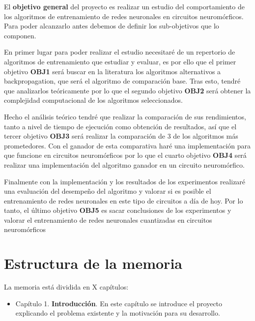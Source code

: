 El \textbf{objetivo general} del proyecto es realizar un estudio del comportamiento de los algoritmos de entrenamiento de redes neuronales en circuitos neuromórficos. Para poder alcanzarlo antes debemos de definir los sub-objetivos que lo componen.  

En primer lugar para poder realizar el estudio necesitaré de un repertorio de algoritmos de entrenamiento que estudiar y evaluar, es por ello que el primer objetivo \textbf{OBJ1} será buscar en la literatura los algoritmos alternativos a backpropagation, que será el algoritmo de comparación base. Tras esto, tendré que analizarlos teóricamente por lo que el segundo objetivo \textbf{OBJ2} será obtener la complejidad computacional de los algoritmos seleccionados. 

Hecho el análisis teórico tendré que realizar la comparación de sus rendimientos, tanto a nivel de tiempo de ejecución como obtención de resultados, así que el tercer objetivo \textbf{OBJ3} será realizar la comparación de 3 de los algoritmos más prometedores. Con el ganador de esta comparativa haré una implementación para que funcione en circuitos neuromórficos por lo que el cuarto objetivo \textbf{OBJ4} será realizar una implementación del algoritmo ganador en un circuito neuromórfico. 

Finalmente con la implementación y los resultados de los experimentos realizaré una evaluación del desempeño del algoritmo y valorar si es posible el entrenamiento de redes neuronales en este tipo de circuitos a día de hoy. Por lo tanto, el último objetivo \textbf{OBJ5} es sacar conclusiones de los experimentos y valorar el entrenamiento de redes neuronales cuantizadas en circuitos neuromórficos

\section{Estructura de la memoria}

La memoria está dividida en X capítulos:
\begin{itemize}
    \item Capítulo 1. \textbf{Introducción}. En este capítulo se introduce el proyecto explicando el problema existente y la motivación para su desarrollo.
\end{itemize}
